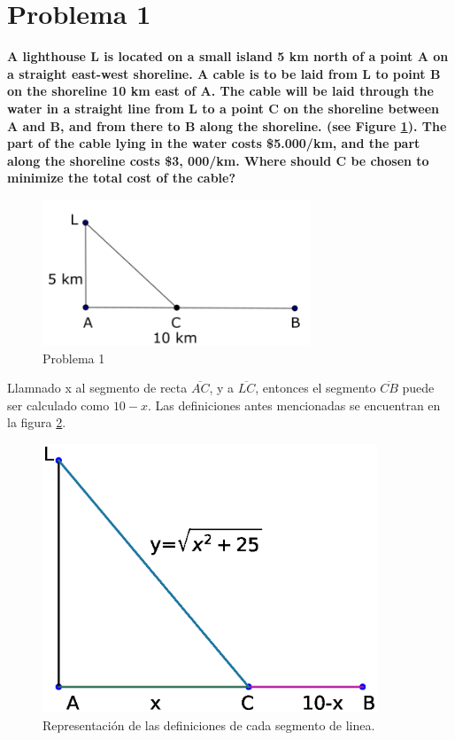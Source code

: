 \section*{Problema 1}
\textbf{A lighthouse L is located on a small island 5 km north of a point A on a straight east-west shoreline. A cable is to be laid from L to point B on the shoreline 10 km east of A. The cable will be laid through the water in a straight line from L to a point C on the shoreline between A and B, and from there to B along the shoreline. (see Figure \ref{fig:problema1}). The part of the cable lying in the water costs \$5.000/km, and the part along the shoreline costs \$3, 000/km. Where should C be chosen to minimize the total cost of the cable?}

\begin{figure}[H]
    \centering
    \includegraphics[width=8cm]{Graphics/problem1.png}
    \caption{Problema 1}
    \label{fig:problema1}
\end{figure}

Llamnado x al segmento de recta $\overline{AC}$, y a $\overline{LC}$, entonces el segmento $\overline{CB}$ puede ser calculado como $10-x$. Las definiciones antes mencionadas se encuentran en la figura \ref{fig:problema1a}.

\begin{figure}[H]
    \centering
    \includegraphics[width=10cm]{Graphics/problem1_graph.eps}
    \caption{Representación de las definiciones de cada segmento de linea.}
    \label{fig:problema1a}
\end{figure}

